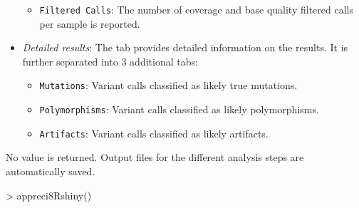 \documentclass{article}
\begin{document}
\begin{itemize}
\begin{itemize}
\item \texttt{Filtered Calls}: The number of coverage and base quality filtered calls per sample is reported.
\end{itemize}
\item \emph{Detailed results}: The tab provides detailed information on the results. It is further separated into 3 additional tabs:
\begin{itemize}
\item \texttt{Mutations}: Variant calls classified as likely true mutations.
\item \texttt{Polymorphisms}: Variant calls classified as likely polymorphisms.
\item \texttt{Artifacts}: Variant calls classified as likely artifacts.
\end{itemize}
\end{itemize}

No value is returned. Output files for the different analysis steps are automatically saved.

\begin{Schunk}
\begin{Sinput}
> appreci8Rshiny()
\end{Sinput}
\end{Schunk}


\newpage



\end{document}
